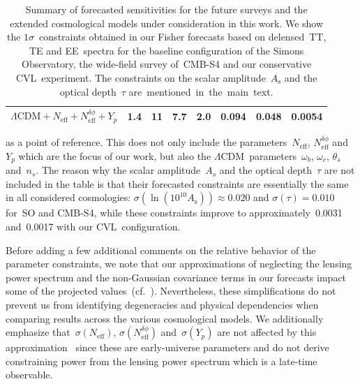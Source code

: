 \documentclass[11pt]{article}
\numberwithin{equation}{section}
\newcommand{\As}{A_\mathrm{s}}
\newcommand{\Neff}{N_\mathrm{eff}}
\newcommand{\Nphase}{N_\mathrm{eff}^{\delta\phi}}
\begin{document}
\begin{table}
{\begin{tabular}{l S[table-format=1.1] S[table-format=2.1] S[table-format=2.1] S[table-format=1.1] S[table-format=1.3] S[table-format=1.3] S[table-format=1.5]}
			$\Lambda\mathrm{CDM} + \Neff + \Nphase + Y_p$	& 1.4						& 11						& 7.7						& 2.0				& 0.094		& 0.048			& 0.0054	\\
				\bottomrule
		\end{tabular}
	}\vspace{-5pt}
	\caption{Summary of forecasted sensitivities for the future surveys and the extended cosmological models under consideration in this work. We show the $1\sigma$~constraints obtained in our Fisher forecasts based on delensed~TT, TE and EE~spectra for the baseline configuration of the Simons Observatory, the wide-field survey of~\mbox{CMB-S4} and our conservative CVL~experiment. The constraints on the scalar amplitude~$\As$ and the optical depth~$\tau$ \mbox{are mentioned in the main text.}}
	\label{tab:forecasts_all}
\end{table}
as a point of reference. This does not only include the parameters~$\Neff$, $\Nphase$ and~$Y_p$ which are the focus of our work, but also the $\Lambda$CDM~parameters~$\omega_b$, $\omega_c$, $\theta_s$ and~$n_s$. The reason why the scalar amplitude~$A_s$ and the optical depth~$\tau$ are not included in the table is that their forecasted constraints are essentially the same in all considered cosmologies: $\sigma(\ln(10^{10}\As)) \approx 0.020$ and $\sigma(\tau) = 0.010$ for~SO and \mbox{CMB-S4}, while these constraints improve to approximately~0.0031 and~0.0017 with our CVL~configuration.

Before adding a few additional comments on the relative behavior of the parameter constraints, we note that our approximations of neglecting the lensing power spectrum and the non-Gaussian covariance terms in our forecasts impact some of the projected values~(cf.~\cite{Green:2016cjr}). Nevertheless, these simplifications do not prevent us from identifying degeneracies and physical dependencies when comparing results across the various cosmological models. We additionally emphasize that~$\sigma(\Neff)$, $\sigma(\Nphase)$ and~$\sigma(Y_p)$ are not affected by this approximation~\cite{Green:2016cjr} since these are early-universe parameters and do not derive constraining power from the lensing power spectrum which is a late-time observable.
\end{document}
